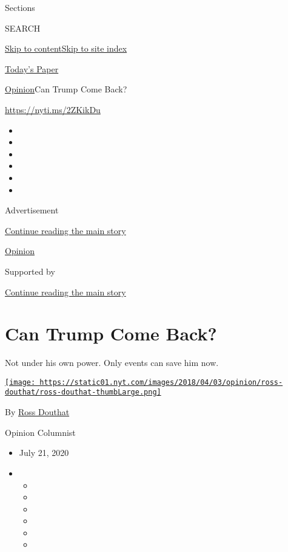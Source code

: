 Sections

SEARCH

\protect\hyperlink{site-content}{Skip to
content}\protect\hyperlink{site-index}{Skip to site index}

\href{https://myaccount.nytimes.com/auth/login?response_type=cookie\&client_id=vi}{}

\href{https://www.nytimes.com/section/todayspaper}{Today's Paper}

\href{/section/opinion}{Opinion}\textbar{}Can Trump Come Back?

\href{https://nyti.ms/2ZKikDu}{https://nyti.ms/2ZKikDu}

\begin{itemize}
\item
\item
\item
\item
\item
\item
\end{itemize}

Advertisement

\protect\hyperlink{after-top}{Continue reading the main story}

\href{/section/opinion}{Opinion}

Supported by

\protect\hyperlink{after-sponsor}{Continue reading the main story}

\hypertarget{can-trump-come-back}{%
\section{Can Trump Come Back?}\label{can-trump-come-back}}

Not under his own power. Only events can save him now.

\href{https://www.nytimes.com/by/ross-douthat}{\texttt{[image: https://static01.nyt.com/images/2018/04/03/opinion/ross-douthat/ross-douthat-thumbLarge.png]}}

By \href{https://www.nytimes.com/by/ross-douthat}{Ross Douthat}

Opinion Columnist

\begin{itemize}
\item
  July 21, 2020
\item
  \begin{itemize}
  \item
  \item
  \item
  \item
  \item
  \item
  \end{itemize}
\end{itemize}

